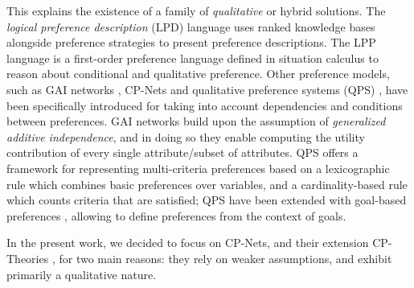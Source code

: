 
This explains the existence of a family of \textit{qualitative} or hybrid solutions. %
The \textit{logical preference description} (LPD) language \cite{Brewka2004} uses ranked knowledge bases alongside preference strategies to present preference descriptions. The LPP language \cite{Bienvenu2006} is a first-order preference language defined in situation calculus to reason about conditional and qualitative preference.
Other preference models, such as GAI networks \cite{Gonzales2004}, CP-Nets \cite{Boutilier2004} and qualitative preference systems (QPS) \cite{Visser2012QPS}, have been specifically introduced for taking into account dependencies and conditions between preferences. GAI networks build upon the assumption of \textit{generalized additive independence}, and in doing so they enable computing the utility contribution of every single attribute/subset of attributes. QPS offers a framework for representing multi-criteria preferences based on a lexicographic rule which combines basic preferences over variables, and a cardinality-based rule which counts criteria that are satisfied; QPS have been extended with goal-based preferences \cite{Visser2013QPS}, allowing to define preferences from the context of goals.

In the present work, we decided to focus on CP-Nets, and their extension CP-Theories \cite{Wilson2004}, for two main reasons: they rely on weaker assumptions, and exhibit primarily a qualitative nature. 


